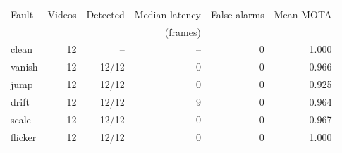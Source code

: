 \begin{tabular}{lrrrrr}
\toprule
Fault & Videos & Detected & Median latency & False alarms & Mean MOTA \\
 & & & (frames) & & \\
\midrule
clean & 12 & -- & -- & 0 & 1.000 \\
vanish & 12 & 12/12 & 0 & 0 & 0.966 \\
jump & 12 & 12/12 & 0 & 0 & 0.925 \\
drift & 12 & 12/12 & 9 & 0 & 0.964 \\
scale & 12 & 12/12 & 0 & 0 & 0.967 \\
flicker & 12 & 12/12 & 0 & 0 & 1.000 \\
\bottomrule
\end{tabular}
